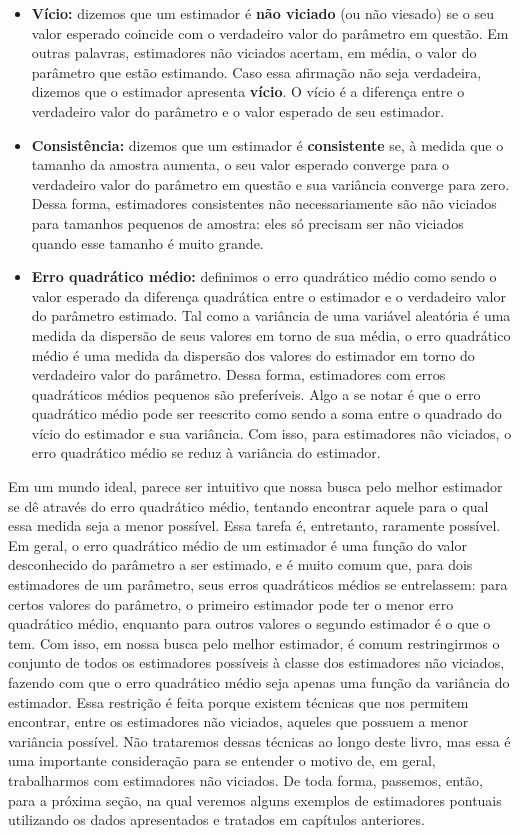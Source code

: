 \documentclass[
  letterpaper,
  DIV=11,
  numbers=noendperiod]{scrreprt}
\begin{document}
\begin{itemize}
\item
  \textbf{Vício:} dizemos que um estimador é \textbf{não viciado} (ou
  não viesado) se o seu valor esperado coincide com o verdadeiro valor
  do parâmetro em questão. Em outras palavras, estimadores não viciados
  acertam, em média, o valor do parâmetro que estão estimando. Caso essa
  afirmação não seja verdadeira, dizemos que o estimador apresenta
  \textbf{vício}. O vício é a diferença entre o verdadeiro valor do
  parâmetro e o valor esperado de seu estimador.
\item
  \textbf{Consistência:} dizemos que um estimador é \textbf{consistente}
  se, à medida que o tamanho da amostra aumenta, o seu valor esperado
  converge para o verdadeiro valor do parâmetro em questão e sua
  variância converge para zero. Dessa forma, estimadores consistentes
  não necessariamente são não viciados para tamanhos pequenos de
  amostra: eles só precisam ser não viciados quando esse tamanho é muito
  grande.
\item
  \textbf{Erro quadrático médio:} definimos o erro quadrático médio como
  sendo o valor esperado da diferença quadrática entre o estimador e o
  verdadeiro valor do parâmetro estimado. Tal como a variância de uma
  variável aleatória é uma medida da dispersão de seus valores em torno
  de sua média, o erro quadrático médio é uma medida da dispersão dos
  valores do estimador em torno do verdadeiro valor do parâmetro. Dessa
  forma, estimadores com erros quadráticos médios pequenos são
  preferíveis. Algo a se notar é que o erro quadrático médio pode ser
  reescrito como sendo a soma entre o quadrado do vício do estimador e
  sua variância. Com isso, para estimadores não viciados, o erro
  quadrático médio se reduz à variância do estimador.
\end{itemize}

Em um mundo ideal, parece ser intuitivo que nossa busca pelo melhor
estimador se dê através do erro quadrático médio, tentando encontrar
aquele para o qual essa medida seja a menor possível. Essa tarefa é,
entretanto, raramente possível. Em geral, o erro quadrático médio de um
estimador é uma função do valor desconhecido do parâmetro a ser
estimado, e é muito comum que, para dois estimadores de um parâmetro,
seus erros quadráticos médios se entrelassem: para certos valores do
parâmetro, o primeiro estimador pode ter o menor erro quadrático médio,
enquanto para outros valores o segundo estimador é o que o tem. Com
isso, em nossa busca pelo melhor estimador, é comum restringirmos o
conjunto de todos os estimadores possíveis à classe dos estimadores não
viciados, fazendo com que o erro quadrático médio seja apenas uma função
da variância do estimador. Essa restrição é feita porque existem
técnicas que nos permitem encontrar, entre os estimadores não viciados,
aqueles que possuem a menor variância possível. Não trataremos dessas
técnicas ao longo deste livro, mas essa é uma importante consideração
para se entender o motivo de, em geral, trabalharmos com estimadores não
viciados. De toda forma, passemos, então, para a próxima seção, na qual
veremos alguns exemplos de estimadores pontuais utilizando os dados
apresentados e tratados em capítulos anteriores.
\end{document}

